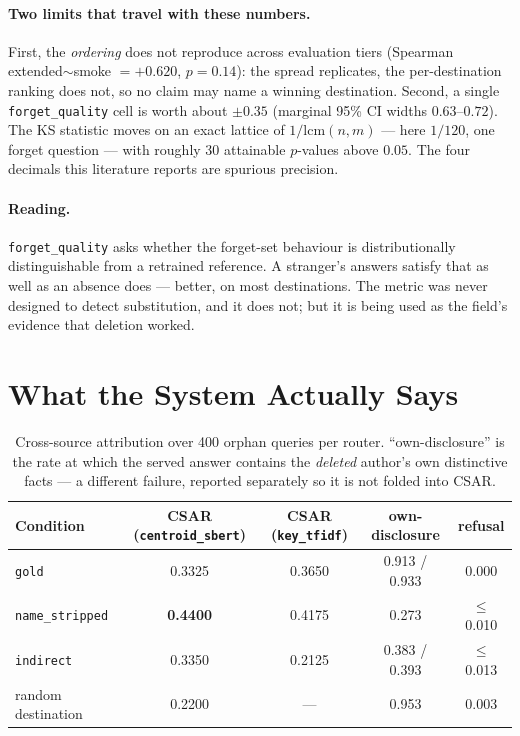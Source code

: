 \documentclass[11pt]{article}
\newcommand{\csar}{CSAR}
\newcommand{\fq}{\texttt{forget\_quality}}
\begin{document}
\paragraph{Two limits that travel with these numbers.} First, the \emph{ordering} does not
reproduce across evaluation tiers (Spearman extended$\sim$smoke $=+0.620$, $p=0.14$): the spread
replicates, the per-destination ranking does not, so no claim may name a winning destination.
Second, a single \fq{} cell is worth about $\pm 0.35$ (marginal 95\% CI widths $0.63$--$0.72$). The
KS statistic moves on an exact lattice of $1/\mathrm{lcm}(n,m)$ --- here $1/120$, one forget
question --- with roughly 30 attainable $p$-values above $0.05$. The four decimals this literature
reports are spurious precision.

\paragraph{Reading.} \fq{} asks whether the forget-set behaviour is distributionally
distinguishable from a retrained reference. A stranger's answers satisfy that as well as an absence
does --- better, on most destinations. The metric was never designed to detect substitution, and it
does not; but it is being used as the field's evidence that deletion worked.

\section{What the System Actually Says}
\label{sec:csar}

\begin{table}[t]
\centering
\begin{tabular}{@{}lcccc@{}}
\toprule
Condition & \csar{} (\texttt{centroid\_sbert}) & \csar{} (\texttt{key\_tfidf}) & own-disclosure & refusal \\
\midrule
\texttt{gold}           & 0.3325 & 0.3650 & 0.913 / 0.933 & 0.000 \\
\texttt{name\_stripped} & \textbf{0.4400} & 0.4175 & 0.273 & $\leq$0.010 \\
\texttt{indirect}       & 0.3350 & 0.2125 & 0.383 / 0.393 & $\leq$0.013 \\
random destination      & 0.2200 & --- & 0.953 & 0.003 \\
\bottomrule
\end{tabular}
\caption{Cross-source attribution over 400 orphan queries per router. ``own-disclosure'' is the rate
at which the served answer contains the \emph{deleted} author's own distinctive facts --- a
different failure, reported separately so it is not folded into \csar{}.}
\label{tab:csar}
\end{table}
\end{document}
